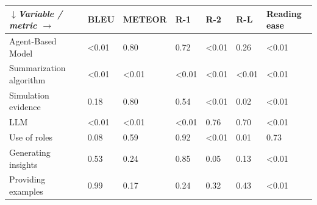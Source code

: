 \begin{tabular}{|l|l|l|l|l|l|l|}
\hline
\textit{$\downarrow$Variable / metric $\rightarrow$} & BLEU & METEOR & R-1 & R-2 & R-L & Reading ease \\
 \hline
 Agent-Based Model & \textless{}0.01 & 0.80 & 0.72 & \textless{}0.01 & 0.26 & \textless{}0.01 \\
 \hline
 Summarization algorithm & \textless{}0.01 & \textless{}0.01 & \textless{}0.01 & \textless{}0.01 & \textless{}0.01 & \textless{}0.01 \\
 \hline
 Simulation evidence & 0.18 & 0.80 & 0.54 & \textless{}0.01 & 0.02 & \textless{}0.01 \\
 \hline
 LLM & \textless{}0.01 & \textless{}0.01 & \textless{}0.01 & 0.76 & 0.70 & \textless{}0.01 \\
 \hline
 Use of roles & 0.08 & 0.59 & 0.92 & \textless{}0.01 & 0.01 & 0.73 \\
 \hline
 Generating insights & 0.53 & 0.24 & 0.85 & 0.05 & 0.13 & \textless{}0.01 \\
 \hline
 Providing examples & 0.99 & 0.17 & 0.24 & 0.32 & 0.43 & \textless{}0.01 \\
\hline
\end{tabular}
